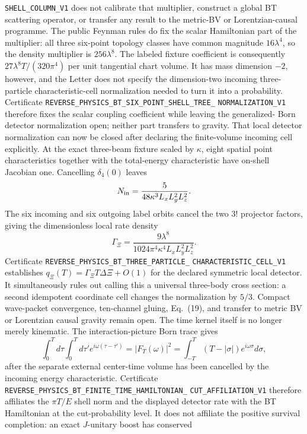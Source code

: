 \documentclass[11pt]{article}
\theoremstyle{definition}
\theoremstyle{remark}
\begin{document}
\allowbreak\texttt{SHELL\_COLUMN\_V1}
does not calibrate that multiplier, construct a global BT scattering operator,
or transfer any result to the metric-BV or Lorentzian-causal programme.
The public Feynman rules do fix the scalar Hamiltonian part of the multiplier:
all three six-point topology classes have common magnitude
$16\lambda^4$, so the density multiplier is $256\lambda^8$.  The labeled
fixture coefficient is consequently $27\lambda^8T/(320\pi^4)$ per unit
tangential chart volume.  It has mass dimension $-2$, however, and the Letter
does not specify the dimension-two incoming three-particle characteristic-cell
normalization needed to turn it into a probability.  Certificate
\texttt{REVERSE\_PHYSICS\_BT\_SIX\_POINT\_SHELL\_TREE\_}
\allowbreak\texttt{NORMALIZATION\_V1}
therefore fixes the scalar coupling coefficient while leaving the generalized-
Born detector normalization open; neither part transfers to gravity.
That local detector normalization can now be closed after declaring the
finite-volume incoming cell explicitly.  At the exact three-beam fixture
scaled by $\kappa$, eight spatial point characteristics together with the
total-energy characteristic have on-shell Jacobian one.  Cancelling
$\delta_4(0)$ leaves
\[
 N_{\rm in}=\frac{5}{48\kappa^3L_xL_y^2L_z^2}.
\]
The six incoming and six outgoing label orbits cancel the two $3!$ projector
factors, giving the dimensionless local rate density
\[
 \Gamma_\Xi=\frac{9\lambda^8}
 {1024\pi^4\kappa^4L_xL_y^2L_z^2}.
\]
Certificate
\texttt{REVERSE\_PHYSICS\_BT\_THREE\_PARTICLE\_}
\allowbreak\texttt{CHARACTERISTIC\_CELL\_V1}
establishes $q_\Xi(T)=\Gamma_\Xi T\Delta\Xi+O(1)$ for the declared symmetric
local detector.  It simultaneously rules out calling this a universal
three-body cross section: a second idempotent coordinate cell changes the
normalization by $5/3$.  Compact wave-packet convergence, ten-channel gluing,
Eq.~(19), and transfer to metric BV or Lorentzian causal gravity remain open.
The time kernel itself is no longer merely kinematic.  The interaction-picture
Born trace gives
\[
 \int_0^Td\tau\int_0^Td\tau' e^{i\omega(\tau-\tau')}
 =|F_T(\omega)|^2
 =\int_{-T}^T(T-|\sigma|)e^{i\omega\sigma}d\sigma,
\]
after the separate external center-time volume has been cancelled by the
incoming energy characteristic.  Certificate
\texttt{REVERSE\_PHYSICS\_BT\_FINITE\_TIME\_HAMILTONIAN\_}
\allowbreak\texttt{CUT\_AFFILIATION\_V1}
therefore affiliates the $\pi T/E$ shell norm and the displayed detector rate
with the BT Hamiltonian at the cut-probability level.  It does not affiliate
the positive survival completion: an exact $J$-unitary boost has conserved
\end{document}
